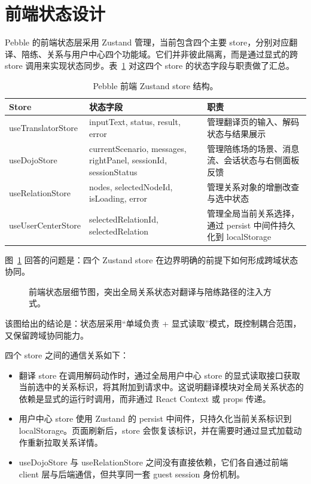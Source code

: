 \section{前端状态设计}


Pebble 的前端状态层采用 Zustand 管理，当前包含四个主要 store，分别对应翻译、陪练、关系与用户中心四个功能域。它们并非彼此隔离，而是通过显式的跨 store 调用来实现状态同步。表~\ref{tab:pebble-stores} 对这四个 store 的状态字段与职责做了汇总。

\begin{table}[H]
  \centering
  \caption{Pebble 前端 Zustand store 结构。}
  \label{tab:pebble-stores}
  \begin{tabularx}{\textwidth}{>{\raggedright\arraybackslash}p{2.8cm} >{\raggedright\arraybackslash}X >{\raggedright\arraybackslash}X}
    \toprule
    Store & 状态字段 & 职责 \\
    \midrule
    useTranslatorStore & inputText, status, result, error & 管理翻译页的输入、解码状态与结果展示 \\
    useDojoStore & currentScenario, messages, rightPanel, sessionId, sessionStatus & 管理陪练场的场景、消息流、会话状态与右侧面板反馈 \\
    useRelationStore & nodes, selectedNodeId, isLoading, error & 管理关系对象的增删改查与选中状态 \\
    useUserCenterStore & selectedRelationId, selectedRelation & 管理全局当前关系选择，通过 persist 中间件持久化到 localStorage \\
    \bottomrule
  \end{tabularx}
\end{table}

图~\ref{fig:pebble-state-layer-detail} 回答的问题是：四个 Zustand store 在边界明确的前提下如何形成跨域状态协同。

\begin{figure}[H]
  \centering
  
  \caption{前端状态层细节图，突出全局关系状态对翻译与陪练路径的注入方式。}
  \label{fig:pebble-state-layer-detail}
\end{figure}

该图给出的结论是：状态层采用“单域负责 + 显式读取”模式，既控制耦合范围，又保留跨域协同能力。

四个 store 之间的通信关系如下：

\begin{itemize}
  \item 翻译 store 在调用解码动作时，通过全局用户中心 store 的显式读取接口获取当前选中的关系标识，将其附加到请求中。这说明翻译模块对全局关系状态的依赖是显式的运行时调用，而非通过 React Context 或 props 传递。
  \item 用户中心 store 使用 Zustand 的 persist 中间件，只持久化当前关系标识到 localStorage。页面刷新后，store 会恢复该标识，并在需要时通过显式加载动作重新拉取关系详情。
  \item useDojoStore 与 useRelationStore 之间没有直接依赖，它们各自通过前端 client 层与后端通信，但共享同一套 guest session 身份机制。
\end{itemize}

